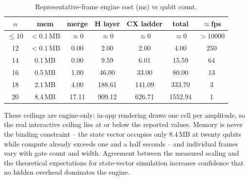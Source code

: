 \begin{table}[h]
\centering
\caption{Representative-frame engine cost (ms) vs qubit count.}
\label{tab:pipeline}
\begin{tabular}{c|c|ccc|c|c}
$n$ & mem & merge & H layer & CX ladder & total & $\approx$fps \\ \hline
$\le 10$ & $<0.1$\,MB & $\approx 0$ & $\approx 0$ & $\approx 0$ & $\approx 0$ & $>10000$ \\
12 & $<0.1$\,MB & 0.00 & 2.00 & 2.00 & 4.00 & 250 \\
14 & 0.1\,MB & 0.00 & 9.59 & 6.01 & 15.59 & 64 \\
16 & 0.5\,MB & 1.00 & 46.00 & 33.00 & 80.00 & 13 \\
18 & 2.1\,MB & 4.00 & 188.61 & 141.09 & 333.70 & 3 \\
20 & 8.4\,MB & 17.11 & 909.12 & 626.71 & 1552.94 & 1 \\
\end{tabular}
\end{table}

These ceilings are engine-only: in-app rendering draws one cell per
amplitude, so the real interactive ceiling lies at or below the reported
values. Memory is never the binding constraint -- the state vector
occupies only 8.4\,MB at twenty qubits while compute already exceeds one
and a half seconds -- and individual frames vary with gate count and
width. Agreement between the measured scaling and the theoretical
expectations for state-vector simulation increases confidence that no
hidden overhead dominates the engine.
